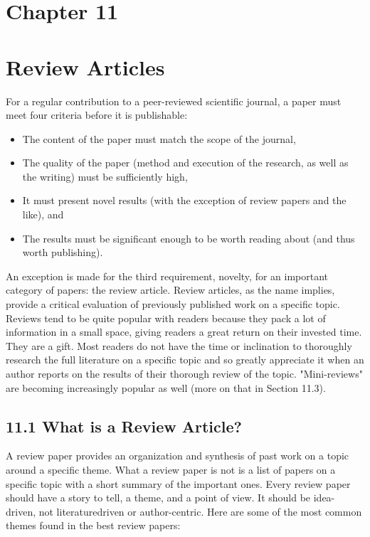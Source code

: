 \section*{Chapter 11}
\section*{Review Articles}
For a regular contribution to a peer-reviewed scientific journal, a paper must meet four criteria before it is publishable:

\begin{itemize}
  \item The content of the paper must match the scope of the journal,
  \item The quality of the paper (method and execution of the research, as well as the writing) must be sufficiently high,
  \item It must present novel results (with the exception of review papers and the like), and
  \item The results must be significant enough to be worth reading about (and thus worth publishing).
\end{itemize}

An exception is made for the third requirement, novelty, for an important category of papers: the review article. Review articles, as the name implies, provide a critical evaluation of previously published work on a specific topic. Reviews tend to be quite popular with readers because they pack a lot of information in a small space, giving readers a great return on their invested time. They are a gift. Most readers do not have the time or inclination to thoroughly research the full literature on a specific topic and so greatly appreciate it when an author reports on the results of their thorough review of the topic. "Mini-reviews" are becoming increasingly popular as well (more on that in Section 11.3).

\subsection*{11.1 What is a Review Article?}
A review paper provides an organization and synthesis of past work on a topic around a specific theme. What a review paper is not is a list of papers on a specific topic with a short summary of the important ones. Every review paper should have a story to tell, a theme, and a point of view. It should be idea-driven, not literaturedriven or author-centric. Here are some of the most common themes found in the best review papers:

